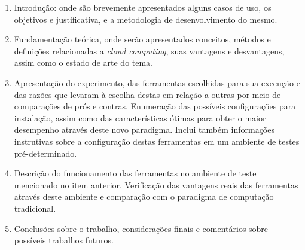 \begin{enumerate}

    \item
        Introdução: onde são brevemente apresentados alguns casos de uso, os objetivos
        e justificativa, e a metodologia de desenvolvimento do mesmo.

    \item
        Fundamentação teórica, onde serão apresentados conceitos, métodos e definições
        relacionadas a \emph{cloud computing}, suas vantagens e desvantagens, assim como
        o estado de arte do tema.

    \item
        Apresentação do experimento, das ferramentas escolhidas para sua execução e das razões que levaram à
        escolha destas em relação a outras por meio de comparações de prós e contras. Enumeração das possíveis
        configurações para instalação, assim como das características ótimas para obter o maior desempenho através
        deste novo paradigma. Inclui também informações instrutivas sobre a configuração destas ferramentas em um ambiente de testes pré-determinado.

    \item
        Descrição do funcionamento das ferramentas no ambiente de teste mencionado no item anterior.
        Verificação das vantagens reais das ferramentas através deste ambiente e comparação com o paradigma de computação tradicional.

    \item
        Conclusões sobre o trabalho, considerações finais e comentários sobre possíveis trabalhos futuros.

\end{enumerate}

